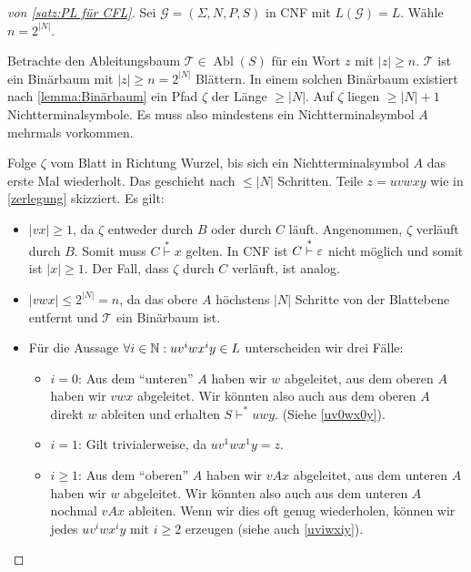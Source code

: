 \begin{proof}[von \autoref{satz:PL für CFL}]
	Sei $\mathcal{G}= (\Sigma,N,P,S)$ in \ac{CNF} mit
    $L(\mathcal{G}) = L$. Wähle $n=2^{|N|}$.
    
     Betrachte den Ableitungsbaum $\mathcal{T} \in \operatorname{Abl}(S)$ für ein Wort $z$ mit $|z|\geq n$. 
  $\mathcal{T}$ ist ein Binärbaum mit $|z|\geq n = 2^{|N|}$ Blättern.
  In einem solchen Binärbaum existiert nach \autoref{lemma:Binärbaum} ein Pfad $\zeta$ der Länge $\geq |N|$.
	Auf $\zeta$ liegen $\geq |N|+1$ Nichtterminalsymbole.
	Es muss also mindestens ein Nichtterminalsymbol $A$ mehrmals vorkommen.
	
  Folge $\zeta$ vom Blatt in Richtung Wurzel, bis sich ein Nichtterminalsymbol $A$ das erste Mal wiederholt. Das geschieht nach $\le |N|$ Schritten.
  Teile $z = uvwxy$ wie in \autoref{zerlegung} skizziert. Es gilt:
      \begin{itemize}
      \item $|vx|\geq 1$, da $\zeta$ entweder durch $B$ oder durch $C$ läuft.
        Angenommen, $\zeta$ verläuft durch $B$.
        Somit muss $C \stackrel{*}{\vdash} x$ gelten. In \ac{CNF} ist $C \stackrel{*}{\vdash} \varepsilon$ nicht möglich und somit ist $|x| \ge 1$.
        Der Fall, dass $\zeta$ durch $C$ verläuft, ist analog.
      \item $|vwx| \le 2^{|N|} = n$, da das obere $A$ höchstens $|N|$ Schritte von der Blattebene entfernt und $\mathcal{T}$ ein Binärbaum ist.
      \item Für die Aussage $\forall i\in\mathbb{N}: uv^iwx^iy\in L$ unterscheiden wir drei Fälle:
      \begin{itemize}
				\item $i=0$: Aus dem "`unteren"' $A$ haben wir $w$ abgeleitet,
				aus dem oberen $A$ haben wir $vwx$ abgeleitet.
				Wir könnten also auch aus dem oberen $A$ direkt $w$ ableiten und erhalten $S\vdash^* uwy$.
				(Siehe \autoref{uv0wx0y}).
				\item $i=1$: Gilt trivialerweise, da $uv^1wx^1y=z$.
				\item $i\geq 1$: Aus dem "`oberen"' $A$ haben wir $vAx$ abgeleitet,
				aus dem unteren $A$ haben wir $w$ abgeleitet.
				Wir könnten also auch aus dem unteren $A$ nochmal $vAx$ ableiten.
				Wenn wir dies oft genug wiederholen, können wir jedes $uv^iwx^iy$ mit $i\geq 2$ erzeugen
				(siehe auch \autoref{uviwxiy}).
				

\end{itemize}
\end{itemize}
\end{proof}
